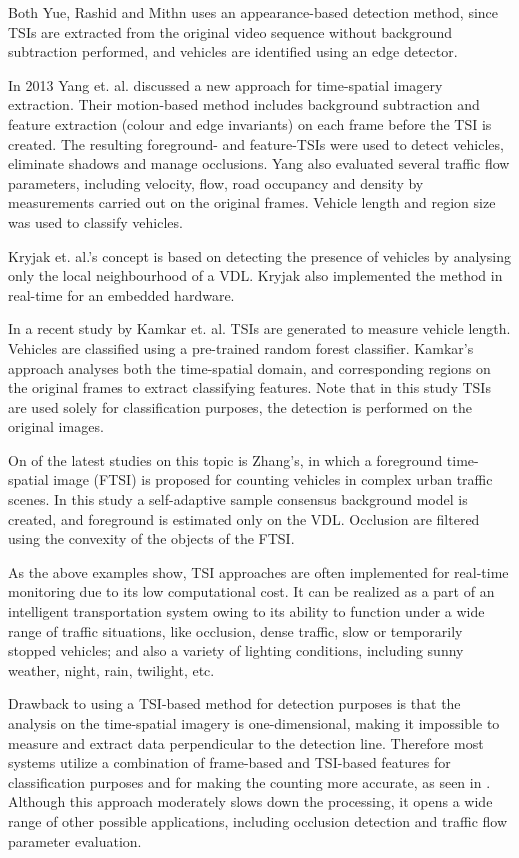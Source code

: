 Both Yue, Rashid and Mithn uses an appearance-based detection method, since TSIs are extracted from the original video sequence without background subtraction performed, and vehicles are identified using an edge detector.

In 2013 Yang et. al. discussed a new approach for time-spatial imagery extraction\cite{Yang2013a}.
Their motion-based method includes background subtraction and feature extraction (colour and edge invariants) on each frame before the TSI is created.
The resulting foreground- and feature-TSIs were used to detect vehicles, eliminate shadows and manage occlusions.
Yang also evaluated several traffic flow parameters, including velocity, flow, road occupancy and density by measurements carried out on the original frames. 
Vehicle length and region size was used to classify vehicles.

Kryjak et. al.'s concept is based on detecting the presence of vehicles by analysing only the local neighbourhood of a VDL.
Kryjak also implemented the method in real-time for an embedded hardware\cite{Kryjak2014}.

In a recent study by Kamkar et. al. TSIs are generated to measure vehicle length. Vehicles are classified using a pre-trained random forest classifier\cite{Kamkar2016}. 
Kamkar's approach analyses both the time-spatial domain, and corresponding regions on the original frames to extract classifying features.
Note that in this study TSIs are used solely for classification purposes, the detection is performed on the original images.

On of the latest studies on this topic is Zhang's, in which a foreground time-spatial image (FTSI) is proposed for counting vehicles in complex urban traffic scenes\cite{Zhang2016}.
In this study a self-adaptive sample consensus background model is created, and foreground is estimated only on the VDL.
Occlusion are filtered using the convexity of the objects of the FTSI.

As the above examples show, TSI approaches are often implemented for real-time monitoring due to its low computational cost.
It can be realized as a part of an intelligent transportation system owing to its ability to function under a wide range of traffic situations, like occlusion, dense traffic, slow or temporarily stopped vehicles; and also a variety of lighting conditions, including sunny weather, night, rain, twilight, etc.

Drawback to using a TSI-based method for detection purposes is that the analysis on the time-spatial imagery is one-dimensional, making it impossible to measure and extract data perpendicular to the detection line.
Therefore most systems utilize a combination of frame-based and TSI-based features for classification purposes and for making the counting more accurate, as seen in \cite{Kryjak2014, Yang2013a}. 
Although this approach moderately slows down the processing, it opens a wide range of other possible applications, including occlusion detection and traffic flow parameter evaluation.

